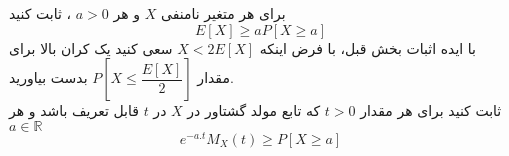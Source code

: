 \problem{}
\subproblem{}
برای هر متغیر نامنفی $X$ و هر $a > 0$ ،
ثابت کنید\\
\[E[X] \geq aP[X\geq a]\]
\subproblem{}
با ایده اثبات بخش قبل، با فرض اینکه $X<2E[X]$
سعی کنید یک کران بالا برای مقدار $P[X \leq \dfrac{E[X]}{2}]$
بدست بیاورید.\\
\subproblem{}
ثابت کنید برای هر مقدار $t > 0$ که تابع مولد گشتاور در $X$
در $t$
قابل تعریف باشد و هر $a \in \mathbb{R}$
\[e^{-a.t}M_X(t) \geq P[X\geq a]\]\\